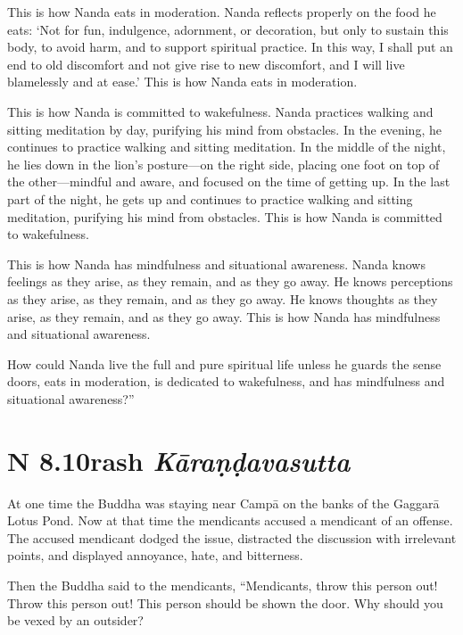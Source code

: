 \documentclass[12pt,openany]{book}%
\newcommand*{\suttatitleacronym}[1]{\smaller[2]{#1}\vspace*{.3em}}
\newcommand*{\suttatitletranslation}[1]{\linebreak{#1}}
\newcommand*{\suttatitleroot}[1]{\linebreak\smaller[2]\itshape{#1}}
\newcommand*{\tocacronym}[1]{\hspace*{-3.3em}{#1}\quad}
\newcommand*{\toctranslation}[1]{#1}
\newcommand*{\tocroot}[1]{(\textit{#1})}
\begin{document}
This is how Nanda eats in moderation. Nanda reflects properly on the food he eats: ‘Not for fun, indulgence, adornment, or decoration, but only to sustain this body, to avoid harm, and to support spiritual practice. In this way, I shall put an end to old discomfort and not give rise to new discomfort, and I will live blamelessly and at ease.’ This is how Nanda eats in moderation. 

This is how Nanda is committed to wakefulness. Nanda practices walking and sitting meditation by day, purifying his mind from obstacles. In the evening, he continues to practice walking and sitting meditation. In the middle of the night, he lies down in the lion’s posture—on the right side, placing one foot on top of the other—mindful and aware, and focused on the time of getting up. In the last part of the night, he gets up and continues to practice walking and sitting meditation, purifying his mind from obstacles. This is how Nanda is committed to wakefulness. 

This is how Nanda has mindfulness and situational awareness. Nanda knows feelings as they arise, as they remain, and as they go away. He knows perceptions as they arise, as they remain, and as they go away. He knows thoughts as they arise, as they remain, and as they go away. This is how Nanda has mindfulness and situational awareness. 

How could Nanda live the full and pure spiritual life unless he guards the sense doors, eats in moderation, is dedicated to wakefulness, and has mindfulness and situational awareness?” 

%
\section*{{\suttatitleacronym AN 8.10}{\suttatitletranslation Trash }{\suttatitleroot Kāraṇḍavasutta}}
\addcontentsline{toc}{section}{\tocacronym{AN 8.10} \toctranslation{Trash } \tocroot{Kāraṇḍavasutta}}

At one time the Buddha was staying near \textsanskrit{Campā} on the banks of the \textsanskrit{Gaggarā} Lotus Pond. Now at that time the mendicants accused a mendicant of an offense. The accused mendicant dodged the issue, distracted the discussion with irrelevant points, and displayed annoyance, hate, and bitterness. 

Then the Buddha said to the mendicants, “Mendicants, throw this person out! Throw this person out! This person should be shown the door. Why should you be vexed by an outsider? 
\end{document}
